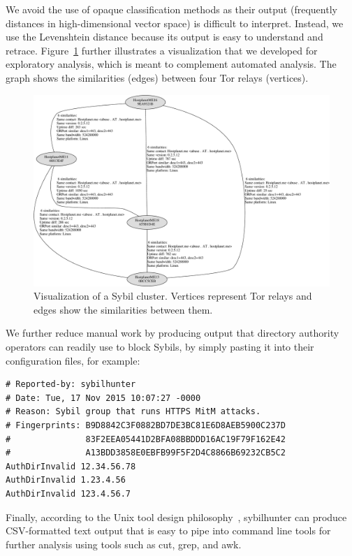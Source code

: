 We avoid the use of opaque classification methods as their output (frequently
distances in high-dimensional vector space) is difficult to interpret.  Instead,
we use the Levenshtein distance because its output is easy to understand and
retrace.  Figure~\ref{fig:visualization} further illustrates a visualization
that we developed for exploratory analysis, which is meant to complement
automated analysis.  The graph shows the similarities (edges) between four Tor
relays (vertices).

\begin{figure}[t]
	\centering
	\includegraphics[width=\linewidth]{diagrams/visualization.pdf}
    \caption{Visualization of a Sybil cluster.  Vertices represent Tor relays
    and edges show the similarities between them.}
	\label{fig:visualization}
\end{figure}

We further reduce manual work by producing output that directory authority
operators can readily use to block Sybils, by simply pasting it into their
configuration files, for example:

{\footnotesize
\begin{verbatim}
# Reported-by: sybilhunter
# Date: Tue, 17 Nov 2015 10:07:27 -0000
# Reason: Sybil group that runs HTTPS MitM attacks.
# Fingerprints: B9D8842C3F0882BD7DE3BC81E6D8AEB5900C237D
#               83F2EEA05441D2BFA08BBDDD16AC19F79F162E42
#               A13BDD3858E0EBFB99F5F2D4C8866B69232CB5C2
AuthDirInvalid 12.34.56.78
AuthDirInvalid 1.23.4.56
AuthDirInvalid 123.4.56.7
\end{verbatim}
}

\noindent Finally, according to the Unix tool design
philosophy~\cite{Pike1983a}, sybilhunter can produce CSV-formatted text output
that is easy to pipe into command line tools for further analysis using tools
such as cut, grep, and awk.

